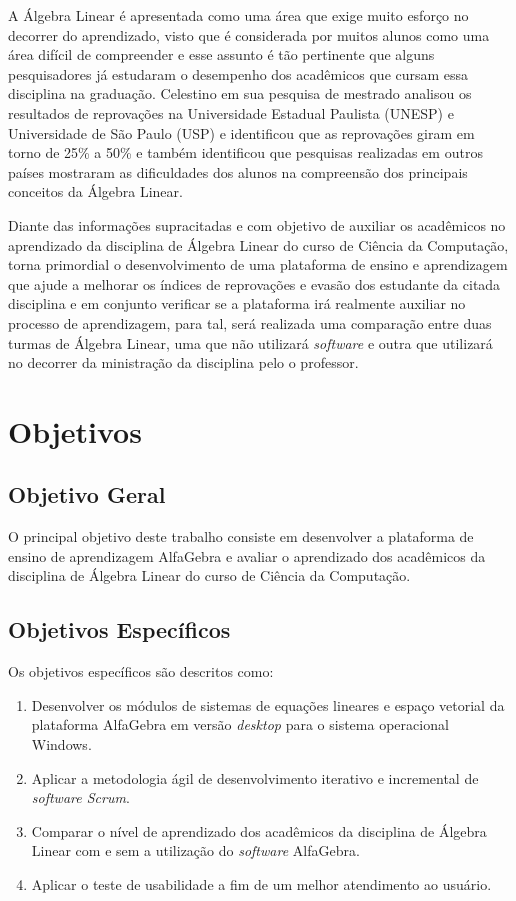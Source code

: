 A Álgebra Linear é apresentada como uma área que exige muito esforço no decorrer do aprendizado, visto que é considerada por muitos alunos como uma área difícil de compreender e esse assunto é tão pertinente que alguns pesquisadores já estudaram o desempenho dos acadêmicos que cursam essa disciplina na graduação. Celestino \cite{2000:celestino} em sua pesquisa de mestrado analisou os resultados de reprovações na Universidade Estadual Paulista (UNESP) e Universidade de São Paulo (USP) e identificou que as reprovações giram em torno de 25\% a 50\% e também identificou que pesquisas realizadas em outros países mostraram as dificuldades dos alunos na compreensão dos principais conceitos da Álgebra Linear.

Diante das informações supracitadas e com objetivo de auxiliar os acadêmicos no aprendizado da disciplina de Álgebra Linear do curso de Ciência da Computação, torna primordial o desenvolvimento de uma plataforma de ensino e aprendizagem que ajude a melhorar os índices de reprovações e evasão dos estudante da citada disciplina e em conjunto verificar se a plataforma irá realmente auxiliar no processo de aprendizagem, para tal, será realizada uma comparação entre duas turmas de Álgebra Linear, uma que não utilizará \textit{software} e outra que utilizará no decorrer da ministração da disciplina pelo o professor.  

\section{Objetivos}

\subsection{Objetivo Geral}

\noindent O principal objetivo deste trabalho consiste em desenvolver a plataforma de ensino de aprendizagem AlfaGebra e avaliar o aprendizado dos acadêmicos da disciplina de Álgebra Linear do curso de Ciência da Computação.

\subsection{Objetivos Específicos}

Os objetivos específicos são descritos como:

\begin{enumerate}
    \item Desenvolver os módulos de sistemas de equações lineares e espaço vetorial da plataforma AlfaGebra em versão \textit{desktop} para o sistema operacional Windows.
	
	\item Aplicar a metodologia ágil de desenvolvimento iterativo e incremental de \textit{software Scrum}.
	
	\item Comparar o nível de aprendizado dos acadêmicos da disciplina de Álgebra Linear com e sem a utilização do \textit{software} AlfaGebra.
	
	\item Aplicar o teste de usabilidade a fim de um melhor atendimento ao usuário.
\end{enumerate}

